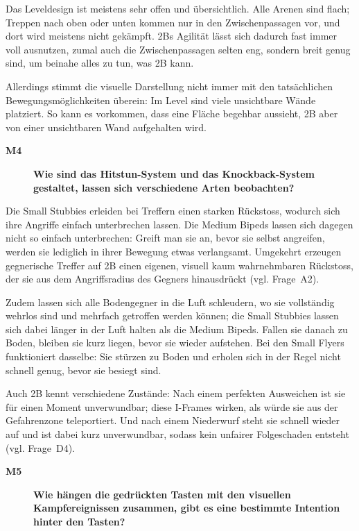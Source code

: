 \documentclass[../Main.tex]{subfiles}
\begin{document}
Das Leveldesign ist meistens sehr offen und übersichtlich. Alle Arenen sind flach; Treppen nach oben oder unten kommen nur in den Zwischenpassagen vor, und dort wird meistens nicht gekämpft. 2Bs Agilität lässt sich dadurch fast immer voll ausnutzen, zumal auch die Zwischenpassagen selten eng, sondern breit genug sind, um beinahe alles zu tun, was 2B kann.

Allerdings stimmt die visuelle Darstellung nicht immer mit den tatsächlichen Bewegungsmöglichkeiten überein: Im Level sind viele unsichtbare Wände platziert. So kann es vorkommen, dass eine Fläche begehbar aussieht, 2B aber von einer unsichtbaren Wand aufgehalten wird.

\begin{description}
    \item[\textbf{M4}] \textbf{Wie sind das Hitstun-System und das Knockback-System gestaltet, lassen sich verschiedene Arten beobachten?}
\end{description}

Die Small Stubbies erleiden bei Treffern einen starken Rückstoss, wodurch sich ihre Angriffe einfach unterbrechen lassen. Die Medium Bipeds lassen sich dagegen nicht so einfach unterbrechen: Greift man sie an, bevor sie selbst angreifen, werden sie lediglich in ihrer Bewegung etwas verlangsamt. Umgekehrt erzeugen gegnerische Treffer auf 2B einen eigenen, visuell kaum wahrnehmbaren Rückstoss, der sie aus dem Angriffsradius des Gegners hinausdrückt (vgl. Frage~A2).

Zudem lassen sich alle Bodengegner in die Luft schleudern, wo sie vollständig wehrlos sind und mehrfach getroffen werden können; die Small Stubbies lassen sich dabei länger in der Luft halten als die Medium Bipeds. Fallen sie danach zu Boden, bleiben sie kurz liegen, bevor sie wieder aufstehen. Bei den Small Flyers funktioniert dasselbe: Sie stürzen zu Boden und erholen sich in der Regel nicht schnell genug, bevor sie besiegt sind.

Auch 2B kennt verschiedene Zustände: Nach einem perfekten Ausweichen ist sie für einen Moment unverwundbar; diese I-Frames wirken, als würde sie aus der Gefahrenzone teleportiert. Und nach einem Niederwurf steht sie schnell wieder auf und ist dabei kurz unverwundbar, sodass kein unfairer Folgeschaden entsteht (vgl. Frage~D4).

\begin{description}
    \item[\textbf{M5}] \textbf{Wie hängen die gedrückten Tasten mit den visuellen Kampfereignissen zusammen, gibt es eine bestimmte Intention hinter den Tasten?}
\end{description}
\end{document}
